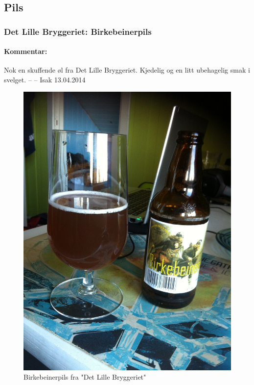 \documentclass[12pt,a4paper,oneside,norsk]{article}
\begin{document}
\newpage
\subsection{Pils}

\subsubsection{Det Lille Bryggeriet: Birkebeinerpils}
\paragraph{Kommentar:}Nok en skuffende øl fra Det Lille Bryggeriet. Kjedelig og en litt ubehagelig smak i svelget. 
\newline
-- -- Isak 13.04.2014

\begin{figure} [H]
\centering
\includegraphics[scale=0.1, angle=270]{Bilder/Ol/birkebeiner.jpg}
\caption{Birkebeinerpils fra "Det Lille Bryggeriet"}
\end{figure}
\end{document}
